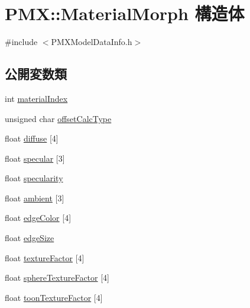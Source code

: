 \hypertarget{struct_p_m_x_1_1_material_morph}{}\section{P\+MX\+:\+:Material\+Morph 構造体}
\label{struct_p_m_x_1_1_material_morph}


{\ttfamily \#include $<$P\+M\+X\+Model\+Data\+Info.\+h$>$}

\subsection*{公開変数類}
\begin{DoxyCompactItemize}
\item 
int \mbox{\hyperlink{struct_p_m_x_1_1_material_morph_a399200b1f1c0ce9488b01dab8bfd565c}{material\+Index}}
\item 
unsigned char \mbox{\hyperlink{struct_p_m_x_1_1_material_morph_a20e4fe65473fc33069f4f0aaf2f1d6dd}{offset\+Calc\+Type}}
\item 
float \mbox{\hyperlink{struct_p_m_x_1_1_material_morph_a51c98638c91c42f31dea0b6ab46fb57b}{diffuse}} \mbox{[}4\mbox{]}
\item 
float \mbox{\hyperlink{struct_p_m_x_1_1_material_morph_a50474eb1d165586015a92137a8968563}{specular}} \mbox{[}3\mbox{]}
\item 
float \mbox{\hyperlink{struct_p_m_x_1_1_material_morph_a113c5a76ea160103bfaea001c0c0053c}{specularity}}
\item 
float \mbox{\hyperlink{struct_p_m_x_1_1_material_morph_adb8981db74b12605e86ec3a24ebb4540}{ambient}} \mbox{[}3\mbox{]}
\item 
float \mbox{\hyperlink{struct_p_m_x_1_1_material_morph_a76618882860ddb7e0b7c8b86af085c36}{edge\+Color}} \mbox{[}4\mbox{]}
\item 
float \mbox{\hyperlink{struct_p_m_x_1_1_material_morph_a581832cc0be878370fae8e8eca7e0fce}{edge\+Size}}
\item 
float \mbox{\hyperlink{struct_p_m_x_1_1_material_morph_af3bbdb4dbfd1e69db3ac361edfe641de}{texture\+Factor}} \mbox{[}4\mbox{]}
\item 
float \mbox{\hyperlink{struct_p_m_x_1_1_material_morph_a94bd837d7f4db773f9e20e976809d366}{sphere\+Texture\+Factor}} \mbox{[}4\mbox{]}
\item 
float \mbox{\hyperlink{struct_p_m_x_1_1_material_morph_a581cc8dab8b265ea2473d9ef3bfc06d1}{toon\+Texture\+Factor}} \mbox{[}4\mbox{]}
\end{DoxyCompactItemize}


